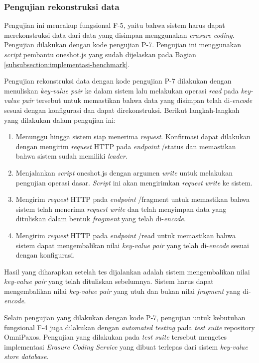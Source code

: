 \subsubsection{Pengujian rekonstruksi data}
\label{subsubsection:pengujian-rekonstruksi-data}

Pengujian ini mencakup fungsional F-5, yaitu bahwa sistem harus dapat merekonstruksi data dari data yang disimpan menggunakan \textit{erasure coding}. Pengujian dilakukan dengan kode pengujian P-7. Pengujian ini menggunakan \textit{script} pembantu oneshot.js yang sudah dijelaskan pada Bagian \ref{subsubsection:implementasi-benchmark}.

Pengujian rekonstruksi data dengan kode pengujian P-7 dilakukan dengan menuliskan \textit{key-value pair} ke dalam sistem lalu melakukan operasi \textit{read} pada \textit{key-value pair} tersebut untuk memastikan bahwa data yang disimpan telah di-\textit{encode} sesuai dengan konfigurasi dan dapat direkonstruksi. Berikut langkah-langkah yang dilakukan dalam pengujian ini:

\begin{enumerate}
	\item Menunggu hingga sistem siap menerima \textit{request}. Konfirmasi dapat dilakukan dengan mengirim \textit{request} HTTP pada \textit{endpoint} /status dan memastikan bahwa sistem sudah memiliki \textit{leader}.
	\item Menjalankan \textit{script} oneshot.js dengan argumen \textit{write} untuk melakukan pengujian operasi dasar. \textit{Script} ini akan mengirimkan \textit{request} \textit{write} ke sistem.
	\item Mengirim \textit{request} HTTP pada \textit{endpoint} /fragment untuk memastikan bahwa sistem telah menerima \textit{request} \textit{write} dan telah menyimpan data yang dituliskan dalam bentuk \textit{fragment} yang telah di-\textit{encode}.
	\item Mengirim \textit{request} HTTP pada \textit{endpoint} /read untuk memastikan bahwa sistem dapat mengembalikan nilai \textit{key-value pair} yang telah di-\textit{encode} sesuai dengan konfigurasi.
\end{enumerate}

Hasil yang diharapkan setelah tes dijalankan adalah sistem mengembalikan nilai \textit{key-value pair} yang telah dituliskan sebelumnya. Sistem harus dapat mengembalikan nilai \textit{key-value pair} yang utuh dan bukan nilai \textit{fragment} yang di-\textit{encode}.

Selain pengujian yang dilakukan dengan kode P-7, pengujian untuk kebutuhan fungsional F-4 juga dilakukan dengan \textit{automated testing} pada \textit{test suite} repository OmniPaxos. Pengujian yang dilakukan pada \textit{test suite} tersebut mengetes implementasi \textit{Erasure Coding Service} yang dibuat terlepas dari sistem \textit{key-value store database}.
